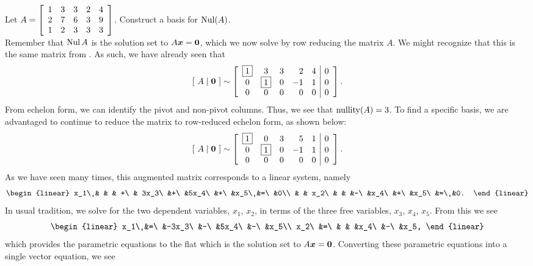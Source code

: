 \begin{Exam}\label{exam:nullspacebasis} Let $A = \mtx{rrrrr}{1&3&3&2&4\\2&7&6&3&9\\1&2&3&3&3}$. Construct a basis for $\nul(A)$. \\

Remember that $\nul A$ is the solution set to $A\bb x = \bb 0$, which we now solve by row reducing the matrix $A$. We might recognize that this is the same matrix from . As such, we have already seen that 
\[[\ A \mid \bb 0\ ] \sim \mtx{ccrrr|r}{\fbox{$1$}&3&3&2&4&0\\0&\fbox{$1$}&0&-1&1&0\\0&0&0&0&0&0}.\]
From echelon form, we can identify the pivot and non-pivot columns. Thus, we see that $\nullity(A)=3$. To find a specific basis, we are advantaged to continue to reduce the matrix to row-reduced echelon form, as shown below:
\[[\ A \mid \bb 0\ ] \sim \mtx{ccrrr|r}{\fbox{$1$}&0&3&5&1&0\\0&\fbox{$1$}&0&-1&1&0\\0&0&0&0&0&0}.\] As we have seen many times, this augmented matrix corresponds to a linear system, namely 
\[\begin{linear} x_1\ & & & +\ & 3x_3\ &+\ &5x_4\ &+\ &x_5\ &=\ &0\\
 & & x_2\ & & &-\ &x_4\ &+\ &x_5\ &=\ &0.
 \end{linear} \] In usual tradition, we solve for the two dependent variables, $x_1$, $x_2$, in terms of the three free variables, $x_3$, $x_4$, $x_5$. From this we see
 \[\begin{linear} x_1\ &=\ &-3x_3\ &-\ &5x_4\ &-\ &x_5\\
 x_2\ &=\ & & &x_4\ &-\ &x_5, \end{linear}\] which provides the parametric equations to the flat which is the solution set to $A\bb x=\bb 0$. Converting these parametric equations into a single vector equation, we see 

\end{Exam}
